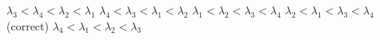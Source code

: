 \documentclass[11pt]{exam}
\begin{document}
\begin{questions}
\begin{choices}
	\choice \( \lambda_3 < \lambda_4 < \lambda_2 < \lambda_1 \)
	\choice \( \lambda_4 < \lambda_3 < \lambda_1 < \lambda_2 \)
	\choice \( \lambda_1 < \lambda_2 < \lambda_3 < \lambda_4 \)
	\choice \( \lambda_2 < \lambda_1 < \lambda_3 < \lambda_4 \) (correct)
	\choice \( \lambda_4 < \lambda_1 < \lambda_2 < \lambda_3 \)
\end{choices}

\vspace{3mm}\end{questions}
\end{document}
